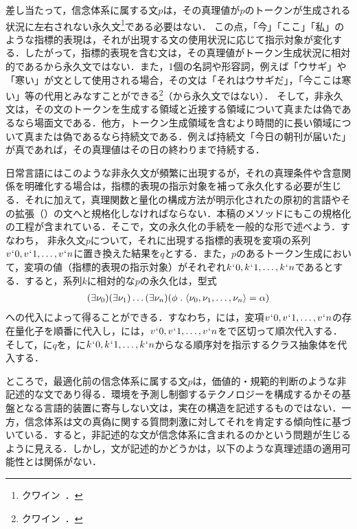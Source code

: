 差し当たって，信念体系に属する文$p$は，その真理値が$p$のトークンが生成される状況に左右されない永久文\footnote{クワイン~\cite[p.\,325]{クワインd}．}である必要はない．
この点，「今」「ここ」「私」のような指標的表現は，それが出現する文の使用状況に応じて指示対象が変化する．したがって，指標的表現を含む文は，その真理値がトークン生成状況に相対的であるから永久文ではない．また，1個の名詞や形容詞，例えば「ウサギ」や「寒い」が文として使用される場合，その文は「それはウサギだ」，「今ここは寒い」等の代用とみなすことができる\footnote{クワイン~\cite[p.\,5]{クワインe}．}（から永久文ではない）．
そして，非永久文は，その文のトークンを生成する領域と近接する領域について真または偽であるなら場面文である．他方，トークン生成領域を含むより時間的に長い領域について真または偽であるなら持続文である．例えば持続文「今日の朝刊が届いた」が真であれば，その真理値はその日の終わりまで持続する．

日常言語にはこのような非永久文が頻繁に出現するが，それの真理条件や含意関係を明確化する場合は，指標的表現の指示対象を補って永久化する必要が生じる．それに加えて，真理関数と量化の構成方法が明示化されたの原初的言語やその拡張（）の文へと規格化しなければならない．本稿のメソッドにもこの規格化の工程が含まれている．そこで，文の永久化の手続を一般的な形で述べよう．すなわち，
非永久文$p$について，それに出現する指標的表現を変項の系列$ v{\mspace{1mu}{`}\mspace{1mu}} 0,v{\mspace{1mu}{`}\mspace{1mu}} 1,\dots,v{\mspace{1mu}{`}\mspace{1mu}} n $に置き換えた結果を$q$とする．また，$p$のあるトークン生成において，変項の値（指標的表現の指示対象）がそれぞれ$ k{\mspace{1mu}{`}\mspace{1mu}} 0,k{\mspace{1mu}{`}\mspace{1mu}} 1,\dots,k{\mspace{1mu}{`}\mspace{1mu}} n $であるとする．すると，系列$k$に相対的な$p$の永久化は，型式
\begin{align*}
    (\exists \nu_0)(\exists \nu_1)\dots(\exists \nu_n)(\phi\con{1}\orp{\nu_0,\nu_1,\dots,\nu_n}=\alpha)
\end{align*}
への代入によって得ることができる．すなわち，には，変項$ v{\mspace{1mu}{`}\mspace{1mu}} 0,v{\mspace{1mu}{`}\mspace{1mu}} 1,\dots,v{\mspace{1mu}{`}\mspace{1mu}} n $の存在量化子を順番に代入し，には，$ v{\mspace{1mu}{`}\mspace{1mu}} 0,v{\mspace{1mu}{`}\mspace{1mu}} 1,\dots,v{\mspace{1mu}{`}\mspace{1mu}} n $を\kagi{$ , $}で区切って順次代入する．そして，\kagi{$ \phi $}に$q$を，\kagi{$ \alpha $}に$ k{\mspace{1mu}{`}\mspace{1mu}} 0,k{\mspace{1mu}{`}\mspace{1mu}} 1,\dots,k{\mspace{1mu}{`}\mspace{1mu}} n $からなる順序対を指示するクラス抽象体を代入する．

ところで，最適化前の信念体系に属する文$p$は，価値的・規範的判断のような非記述的な文であり得る．環境を予測し制御するテクノロジーを構成するかその基盤となる言語的装置に寄与しない文は，実在の構造を記述するものではない．一方，信念体系は文の真偽に関する質問刺激に対してそれを肯定する傾向性に基づいている．すると，非記述的な文が信念体系に含まれるのかという問題が生じるように見える．しかし，文が記述的かどうかは，以下のような真理述語の適用可能性とは関係がない．

